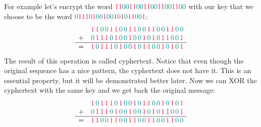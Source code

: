 \documentclass[a4paper,10pt]{article}
\newcommand{\coloredOne}{{\color{carminered} 1}}
\newcommand{\coloredZero}{{\color{darkcyan} 0}}
\begin{document}
For example let's encrypt the word $\coloredOne\coloredOne\coloredZero\coloredZero\coloredOne\coloredOne\coloredZero\coloredZero\coloredOne\coloredOne\coloredZero\coloredZero\coloredOne\coloredOne\coloredZero\coloredZero\coloredOne\coloredOne\coloredZero\coloredZero$ with our key that we choose to be the word $\coloredZero\coloredOne\coloredOne\coloredOne\coloredZero\coloredOne\coloredZero\coloredZero\coloredOne\coloredZero\coloredZero\coloredOne\coloredZero\coloredOne\coloredZero\coloredOne\coloredOne\coloredZero\coloredZero\coloredOne$:
\begin{equation*}
\begin{array}{rl}
  & \coloredOne \,\coloredOne\, \coloredZero \, \coloredZero \,\coloredOne\,\coloredOne\, \coloredZero \, \coloredZero \,\coloredOne\,\coloredOne\, \coloredZero \, \coloredZero \,\coloredOne\,\coloredOne\, \coloredZero \, \coloredZero \,\coloredOne\,\coloredOne\, \coloredZero \, \coloredZero \\
+ & \coloredZero \,\coloredOne\,\coloredOne\,\coloredOne\, \coloredZero \,\coloredOne\, \coloredZero \, \coloredZero \,\coloredOne\, \coloredZero \, \coloredZero \,\coloredOne\, \coloredZero \,\coloredOne\, \coloredZero \,\coloredOne\,\coloredOne\, \coloredZero \, \coloredZero \,\coloredOne\\ \hline
= &  \coloredOne \, \coloredZero \,\coloredOne\,\coloredOne\,\coloredOne\, \coloredZero \,\coloredOne\, \coloredZero \, \coloredZero \,\coloredOne\, \coloredZero \,\coloredOne\,\coloredOne\, \coloredZero \, \coloredZero \,\coloredOne\, \coloredZero \,\coloredOne\, \coloredZero \,\coloredOne
\end{array}
\end{equation*}
The result of this operation is called cyphertext. Notice that even though the original sequence has a nice pattern, the cyphertext does not have it. This is an essential property, but it will be demonstrated better later. Now we can XOR the cyphertext with the same key and we get back the original message:
\begin{equation*}
\begin{array}{rl}
  & \coloredOne\,\coloredZero\,\coloredOne\,\coloredOne\,\coloredOne\,\coloredZero\,\coloredOne\,\coloredZero\,\coloredZero\,\coloredOne\,\coloredZero\,\coloredOne\,\coloredOne\,\coloredZero\,\coloredZero\,\coloredOne\,\coloredZero\,\coloredOne\,\coloredZero\,\coloredOne \\
+ & \coloredZero \,\coloredOne\,\coloredOne\,\coloredOne\,\coloredZero\,\coloredOne\,\coloredZero\,\coloredZero\,\coloredOne\,\coloredZero\,\coloredZero\,\coloredOne\,\coloredZero\,\coloredOne\,\coloredZero\,\coloredOne\,\coloredOne\,\coloredZero\,\coloredZero\,\coloredOne\\ \hline
= & \coloredOne\,\coloredOne\,\coloredZero\,\coloredZero\,\coloredOne\,\coloredOne\,\coloredZero\,\coloredZero\,\coloredOne\,\coloredOne\,\coloredZero\,\coloredZero\,\coloredOne\,\coloredOne\,\coloredZero\,\coloredZero\,\coloredOne\,\coloredOne\,\coloredZero\,\coloredZero
\end{array}
\end{equation*}
\end{document}
